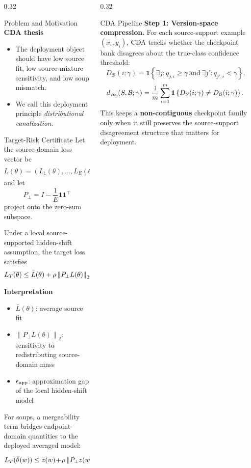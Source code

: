 \documentclass[final]{beamer}
\newcommand{\RR}{\mathbb{R}}
\newcommand{\one}{\mathbf{1}}
\newcommand{\norm}[1]{\left\lVert #1 \right\rVert}
\newcommand{\paren}[1]{\left( #1 \right)}
\newcommand{\braces}[1]{\left\{ #1 \right\}}
\begin{document}
\begin{frame}[t]
\begin{columns}[t,totalwidth=\textwidth]
\begin{column}{0.32\textwidth}
\begin{block}{Problem and Motivation}
\textbf{CDA thesis}
\begin{itemize}
\item The deployment object should have low source fit, low source-mixture sensitivity, and low soup mismatch.
\item We call this deployment principle \emph{distributional canalization}.
\end{itemize}
\end{block}

\begin{exampleblock}{Target-Risk Certificate}
\justifying
Let the source-domain loss vector be
\[
L(\theta)=\paren{L_1(\theta),\ldots,L_E(\theta)}^\top \in \RR^E,
\qquad
\bar L(\theta)=\frac{1}{E}\one^\top L(\theta),
\]
and let
\[
P_\perp = I-\frac{1}{E}\one\one^\top
\]
project onto the zero-sum subspace.

Under a local source-supported hidden-shift assumption, the target loss satisfies
\[
L_T(\theta)
\le
\bar L(\theta)
+
\rho \norm{P_\perp L(\theta)}_2
+
\epsilon_{\rm app}.
\]

\textbf{Interpretation}
\begin{itemize}
\item \(\bar L(\theta)\): average source fit
\item \(\norm{P_\perp L(\theta)}_2\): sensitivity to redistributing source-domain mass
\item \(\epsilon_{\rm app}\): approximation gap of the local hidden-shift model
\end{itemize}

For soups, a mergeability term bridges endpoint-domain quantities to the deployed averaged model:
\[
L_T(\bar\theta(w))
\le
\bar z(w)
\!+\!
\rho \norm{P_\perp z(w)}_2
\!+\!
\paren{E^{-1/2}+\rho}M(w)
\!+\!
\epsilon_{\rm app}.
\]
\end{exampleblock}

\end{column}

\begin{column}{0.32\textwidth}

\begin{alertblock}{CDA Pipeline}
\justifying
\textbf{Step 1: Version-space compression.}
For each source-support example \((x_i,y_i)\), CDA tracks whether the checkpoint bank disagrees about the true-class confidence threshold:
{\small
\[
D_{\mathcal{B}}(i;\gamma)
=
\mathbf{1}\braces{
\exists j: q_{j,i}\ge \gamma
\ \text{and}\
\exists j': q_{j',i}<\gamma }.
\]
\[
d_{\rm vsc}(S,\mathcal{B};\gamma)
=
\frac{1}{m}\sum_{i=1}^{m}
\mathbf{1}\braces{D_S(i;\gamma)\neq D_{\mathcal{B}}(i;\gamma)}.
\]
}
This keeps a \textbf{non-contiguous} checkpoint family only when it still preserves the source-support disagreement structure that matters for deployment.


\end{alertblock}
\end{column}
\end{columns}
\end{frame}
\end{document}
